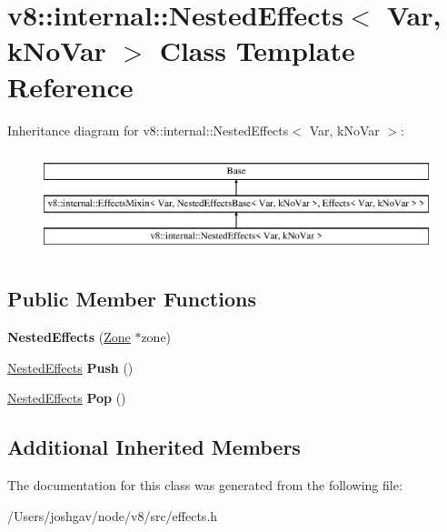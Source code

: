 \hypertarget{classv8_1_1internal_1_1_nested_effects}{}\section{v8\+:\+:internal\+:\+:Nested\+Effects$<$ Var, k\+No\+Var $>$ Class Template Reference}
\label{classv8_1_1internal_1_1_nested_effects}
Inheritance diagram for v8\+:\+:internal\+:\+:Nested\+Effects$<$ Var, k\+No\+Var $>$\+:\begin{figure}[H]
\begin{center}
\leavevmode
\includegraphics[height=3.000000cm]{classv8_1_1internal_1_1_nested_effects}
\end{center}
\end{figure}
\subsection*{Public Member Functions}
\begin{DoxyCompactItemize}
\item 
{\bfseries Nested\+Effects} (\hyperlink{classv8_1_1internal_1_1_zone}{Zone} $\ast$zone)\hypertarget{classv8_1_1internal_1_1_nested_effects_a61782288c87d67c138458ce48275eb30}{}\label{classv8_1_1internal_1_1_nested_effects_a61782288c87d67c138458ce48275eb30}

\item 
\hyperlink{classv8_1_1internal_1_1_nested_effects}{Nested\+Effects} {\bfseries Push} ()\hypertarget{classv8_1_1internal_1_1_nested_effects_a977d8d5567c6f7c5a7f4298ef84d90c6}{}\label{classv8_1_1internal_1_1_nested_effects_a977d8d5567c6f7c5a7f4298ef84d90c6}

\item 
\hyperlink{classv8_1_1internal_1_1_nested_effects}{Nested\+Effects} {\bfseries Pop} ()\hypertarget{classv8_1_1internal_1_1_nested_effects_a13e46446fa7db4a0890935520ed812d6}{}\label{classv8_1_1internal_1_1_nested_effects_a13e46446fa7db4a0890935520ed812d6}

\end{DoxyCompactItemize}
\subsection*{Additional Inherited Members}


The documentation for this class was generated from the following file\+:\begin{DoxyCompactItemize}
\item 
/\+Users/joshgav/node/v8/src/effects.\+h\end{DoxyCompactItemize}
